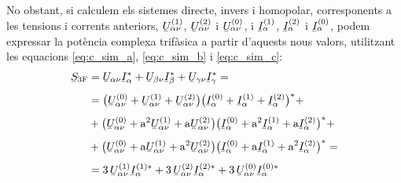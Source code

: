 No obstant, si calculem els sistemes directe, invers i homopolar,
corresponents a les tensions i corrents anteriors,
$\cmplx{U}_{\alpha\nu}\ap{(1)}$, $\cmplx{U}_{\alpha\nu}\ap{(2)}$ i
$\cmplx{U}_{\alpha\nu}\ap{(0)}$, i $\cmplx{I}_\alpha\ap{(1)}$,
$\cmplx{I}_\alpha\ap{(2)}$ i $\cmplx{I}_\alpha\ap{(0)}$, podem
expressar la pot\`{e}ncia complexa trif\`{a}sica a partir d'aquests nous
valors, utilitzant les equacions \eqref{eq:c_sim_a},
\eqref{eq:c_sim_b} i \eqref{eq:c_sim_c}:
\begin{equation}
\begin{split}
   \cmplx{S}\ped{3F} &= \cmplx{U}_{\alpha\nu} \cmplx{I}_\alpha^* +
   \cmplx{U}_{\beta\nu} \cmplx{I}_\beta^* +  \cmplx{U}_{\gamma\nu} \cmplx{I}_\gamma^* = \\[1ex]
   &= \big(\cmplx{U}_{\alpha\nu}^{(0)} + \cmplx{U}_{\alpha\nu}^{(1)} +
   \cmplx{U}_{\alpha\nu}^{(2)}\big) \big(\cmplx{I}_\alpha^{(0)} + \cmplx{I}_\alpha^{(1)} +
   \cmplx{I}_\alpha^{(2)}\big)^* +  \\[1ex]
   &+ \big(\cmplx{U}_{\alpha\nu}^{(0)} + \au^2 \cmplx{U}_{\alpha\nu}^{(1)} +
   \au \cmplx{U}_{\alpha\nu}^{(2)} \big) \big(\cmplx{I}_\alpha^{(0)} + \au^2 \cmplx{I}_\alpha^{(1)}
    + \au \cmplx{I}_\alpha^{(2)} \big)^* + \\[1ex]
   &+ \big(\cmplx{U}_{\alpha\nu}^{(0)} + \au \cmplx{U}_{\alpha\nu}^{(1)} + \au^2
   \cmplx{U}_{\alpha\nu}^{(2)} \big) \big(\cmplx{I}_\alpha^{(0)} + \au
   \cmplx{I}_\alpha^{(1)} + \au^2 \cmplx{I}_\alpha^{(2)} \big)^* =  \\[1ex]
   &= 3\, \cmplx{U}_{\alpha\nu}^{(1)}  \cmplx{I}_\alpha^{(1)*} +
   3\, \cmplx{U}_{\alpha\nu}^{(2)}  \cmplx{I}_\alpha^{(2)*} +
   3\, \cmplx{U}_{\alpha\nu}^{(0)}  \cmplx{I}_\alpha^{(0)*} \label{eq:c_sim_s}
\end{split}
\end{equation}

